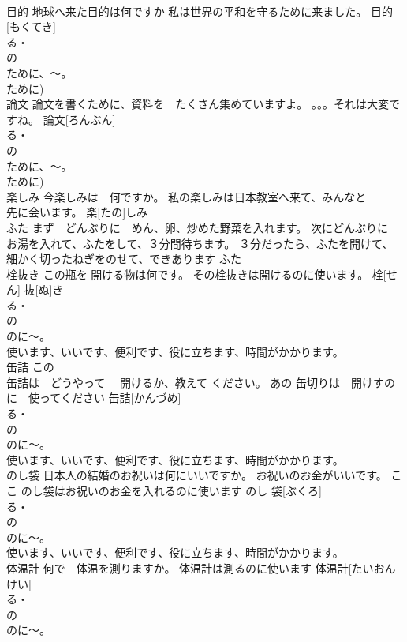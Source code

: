 \documentclass[8pt]{extreport}
\begin{document}
\begin{CJK}{UTF8}{min}
\\	目的	地球へ来た目的は何ですか 私は世界の平和を守るために来ました。	目的[もくてき]			
\\	る・
\\	の　
\\	ために、～。
\\	ために)
\\	論文	論文を書くために、資料を　たくさん集めていますよ。 。。。それは大変ですね。	論文[ろんぶん]			
\\	る・
\\	の　
\\	ために、～。
\\	ために)
\\	楽しみ	今楽しみは　何ですか。 私の楽しみは日本教室へ来て、みんなと 
\\	先に会います。	楽[たの]しみ			
\\	ふた	まず　どんぶりに　めん、卵、炒めた野菜を入れます。 次にどんぶりに　お湯を入れて、ふたをして、３分間待ちます。 ３分だったら、ふたを開けて、細かく切ったねぎをのせて、できあります	ふた			
\\	栓抜き	この瓶を 開ける物は何です。 その栓抜きは開けるのに使います。	栓[せん] 抜[ぬ]き			
\\	る・
\\	の　
\\	のに～。
\\	使います、いいです、便利です、役に立ちます、時間がかかります。	
\\	缶詰	この　 
\\	缶詰は　どうやって　 開けるか、教えて ください。 あの 缶切りは　開けすのに　使ってください	缶詰[かんづめ]			
\\	る・
\\	の　
\\	のに～。
\\	使います、いいです、便利です、役に立ちます、時間がかかります。	
\\	のし袋	日本人の結婚のお祝いは何にいいですか。 お祝いのお金がいいです。 ここ のし袋はお祝いのお金を入れるのに使います	のし 袋[ぶくろ]				
\\	る・
\\	の　
\\	のに～。
\\	使います、いいです、便利です、役に立ちます、時間がかかります。	
\\	体温計	何で　体温を測りますか。 体温計は測るのに使います	体温計[たいおんけい]			
\\	る・
\\	の　
\\	のに～。

\end{CJK}
\end{document}
